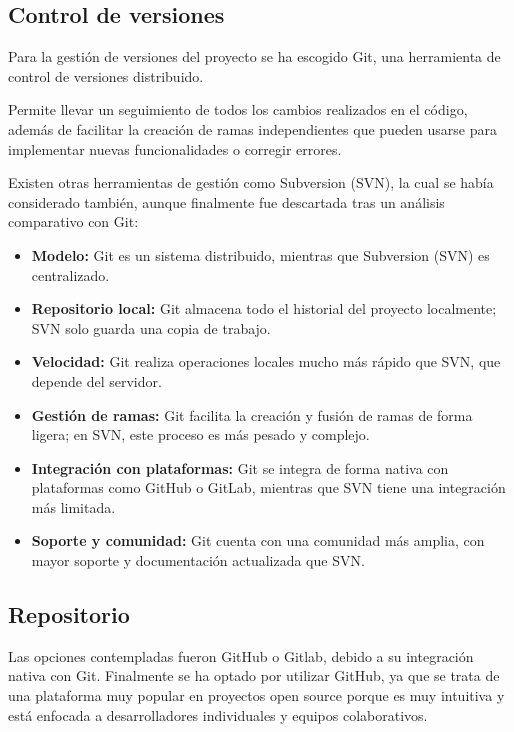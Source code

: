 \subsection{Control de versiones}\label{subsec:control}

Para la gestión de versiones del proyecto se ha escogido Git\cite{git:official}, una herramienta de control de versiones distribuido.

Permite llevar un seguimiento de todos los cambios realizados en el código, además de facilitar la creación de ramas
independientes que pueden usarse para implementar nuevas funcionalidades o corregir errores.

Existen otras herramientas de gestión como Subversion (SVN)\cite{svn:official}, la cual se había considerado también,
aunque finalmente fue descartada tras un análisis comparativo con Git:

\begin{itemize}
    \item \textbf{Modelo:} Git es un sistema distribuido, mientras que Subversion (SVN) es centralizado.
    \item \textbf{Repositorio local:} Git almacena todo el historial del proyecto localmente; SVN solo guarda una copia de trabajo.
    \item \textbf{Velocidad:} Git realiza operaciones locales mucho más rápido que SVN, que depende del servidor.
    \item \textbf{Gestión de ramas:} Git facilita la creación y fusión de ramas de forma ligera; en SVN, este proceso es más pesado y complejo.
    \item \textbf{Integración con plataformas:} Git se integra de forma nativa con plataformas como GitHub o GitLab, mientras que SVN tiene una integración más limitada.
    \item \textbf{Soporte y comunidad:} Git cuenta con una comunidad más amplia, con mayor soporte y documentación actualizada que SVN.
\end{itemize}

\subsection{Repositorio}\label{subsec:repositorio}

Las opciones contempladas fueron GitHub o Gitlab, debido a su integración nativa con Git.
Finalmente se ha optado por utilizar GitHub\cite{wikipedia:github}, ya que se trata de una plataforma muy popular en proyectos open source porque es
muy intuitiva y está enfocada a desarrolladores individuales y equipos colaborativos.

